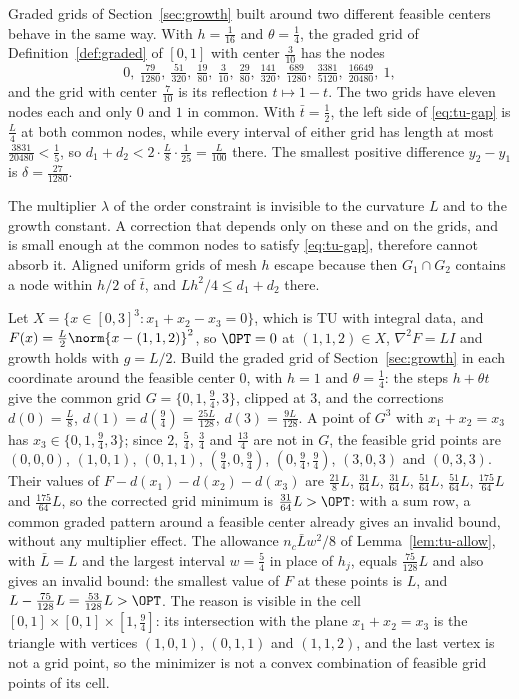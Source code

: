 Graded grids of Section~\ref{sec:growth} built around two different feasible
centers behave in the same way. With $h=\frac1{16}$ and $\theta=\frac14$, the
graded grid of Definition~\ref{def:graded} of $[0,1]$ with center
$\frac3{10}$ has the nodes
\[
0,\ \tfrac{79}{1280},\ \tfrac{51}{320},\ \tfrac{19}{80},\ \tfrac3{10},\
\tfrac{29}{80},\ \tfrac{141}{320},\ \tfrac{689}{1280},\ \tfrac{3381}{5120},\
\tfrac{16649}{20480},\ 1,
\]
and the grid with center $\frac7{10}$ is its reflection $t\mapsto1-t$. The
two grids have eleven nodes each and only $0$ and $1$ in common. With
$\bar t=\frac12$, the left side of \eqref{eq:tu-gap} is $\frac L4$ at both
common nodes, while every interval of either grid has length at most
$\frac{3831}{20480}<\frac15$, so
$d_1+d_2<2\cdot\frac L8\cdot\frac1{25}=\frac L{100}$ there. The smallest
positive difference $y_2-y_1$ is $\delta=\frac{27}{1280}$.

The multiplier $\lambda$ of the order constraint is invisible to the
curvature $L$ and to the growth constant. A correction that depends only on
these and on the grids, and is small enough at the common nodes to satisfy
\eqref{eq:tu-gap}, therefore cannot absorb it. Aligned uniform grids of mesh
$h$ escape because then $G_1\cap G_2$ contains a node within $h/2$ of $\bar t$, and
$Lh^2/4\le d_1+d_2$ there.

\begin{example}\label{ex:tu-sum}
Let $X=\{x\in[0,3]^3:x_1+x_2-x_3=0\}$, which is TU with integral data, and
$F(x)=\frac L2\norm{x-(1,1,2)}^2$, so $\OPT=0$ at $(1,1,2)\in X$,
$\nabla^2F=LI$ and growth holds with $g=L/2$. Build the graded grid of
Section~\ref{sec:growth} in each coordinate around the feasible center $0$,
with $h=1$ and $\theta=\frac14$: the steps $h+\theta t$ give the common grid
$G=\{0,1,\frac94,3\}$, clipped at $3$, and the corrections
$d(0)=\frac L8$, $d(1)=d(\frac94)=\frac{25L}{128}$, $d(3)=\frac{9L}{128}$.
A point of $G^3$ with $x_1+x_2=x_3$ has $x_3\in\{0,1,\frac94,3\}$; since
$2$, $\frac54$, $\frac34$ and $\frac{13}4$ are not in $G$, the feasible grid
points are $(0,0,0)$, $(1,0,1)$, $(0,1,1)$, $(\frac94,0,\frac94)$,
$(0,\frac94,\frac94)$, $(3,0,3)$ and $(0,3,3)$. Their values of
$F-d(x_1)-d(x_2)-d(x_3)$ are $\frac{21}8L$, $\frac{31}{64}L$,
$\frac{31}{64}L$, $\frac{51}{64}L$, $\frac{51}{64}L$, $\frac{175}{64}L$ and
$\frac{175}{64}L$, so the corrected grid minimum is $\frac{31}{64}L>\OPT$:
with a sum row, a common graded pattern around a feasible center already
gives an invalid bound, without any multiplier effect. The allowance
$n_c\bar Lw^2/8$ of Lemma~\ref{lem:tu-allow}, with $\bar L=L$ and the largest
interval $w=\frac54$ in place of $h_j$, equals $\frac{75}{128}L$ and also
gives an invalid bound: the smallest value of $F$ at these points is $L$, and
$L-\frac{75}{128}L=\frac{53}{128}L>\OPT$. The reason is visible in the cell
$[0,1]\times[0,1]\times[1,\frac94]$: its intersection with the plane
$x_1+x_2=x_3$ is the triangle with vertices $(1,0,1)$, $(0,1,1)$ and
$(1,1,2)$, and the last vertex is not a grid point, so the minimizer is not a
convex combination of feasible grid points of its cell.
\end{example}
